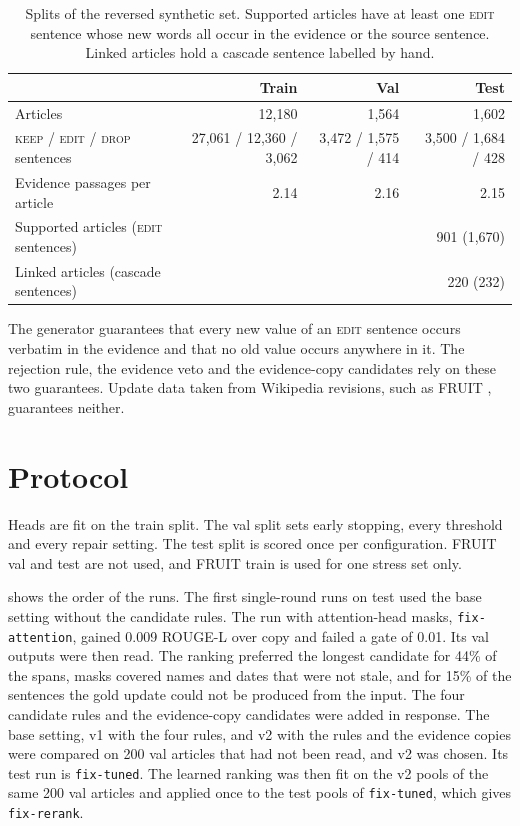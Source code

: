 \documentclass[]{paper}
\newcommand{\keep}{\textsc{keep}}
\newcommand{\edit}{\textsc{edit}}
\newcommand{\drop}{\textsc{drop}}
\newcommand{\run}[1]{\texttt{#1}}
\begin{document}
\begin{table}[H]
\caption{Splits of the reversed synthetic set. Supported articles have at least one \edit{} sentence whose new words all occur in the evidence or the source sentence. Linked articles hold a cascade sentence labelled by hand.}
\label{tab:data}
\centering
\footnotesize
\begin{tabular}{lrrr}
\toprule
 & Train & Val & Test \\
\midrule
Articles & 12,180 & 1,564 & 1,602 \\
\keep{} / \edit{} / \drop{} sentences & 27,061 / 12,360 / 3,062 & 3,472 / 1,575 / 414 & 3,500 / 1,684 / 428 \\
Evidence passages per article & 2.14 & 2.16 & 2.15 \\
Supported articles (\edit{} sentences) & & & 901 (1,670) \\
Linked articles (cascade sentences) & & & 220 (232) \\
\bottomrule
\end{tabular}
\end{table}

The generator guarantees that every new value of an \edit{} sentence occurs verbatim in the evidence and that no old value occurs anywhere in it. The rejection rule, the evidence veto and the evidence-copy candidates rely on these two guarantees. Update data taken from Wikipedia revisions, such as FRUIT \citep{iv-etal-2022-fruit}, guarantees neither.

\section{Protocol}
\label{sec:protocol}

Heads are fit on the train split. The val split sets early stopping, every threshold and every repair setting. The test split is scored once per configuration. FRUIT val and test are not used, and FRUIT train is used for one stress set only.

 shows the order of the runs. The first single-round runs on test used the base setting without the candidate rules. The run with attention-head masks, \run{fix-attention}, gained 0.009 ROUGE-L over copy and failed a gate of 0.01. Its val outputs were then read. The ranking preferred the longest candidate for 44\% of the spans, masks covered names and dates that were not stale, and for 15\% of the sentences the gold update could not be produced from the input. The four candidate rules and the evidence-copy candidates were added in response. The base setting, v1 with the four rules, and v2 with the rules and the evidence copies were compared on 200 val articles that had not been read, and v2 was chosen. Its test run is \run{fix-tuned}. The learned ranking was then fit on the v2 pools of the same 200 val articles and applied once to the test pools of \run{fix-tuned}, which gives \run{fix-rerank}.
\end{document}
